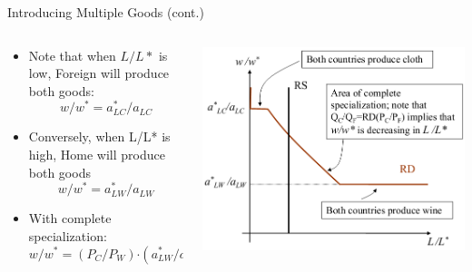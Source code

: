 \documentclass[10pt,hyperref={CJKbookmarks=true},xcolor=dvipsnames,aspectratio=169]{beamer}
\begin{document}
\begin{frame}{Introducing Multiple Goods (cont.) }


\begin{columns}[onlytextwidth]
\begin{column}{0.5\textwidth}
\begin{itemize}
\item Note that when $L/L*$ is low, Foreign will produce both goods: 
\[
w/w^{*}=a{}_{LC}^{*}/a_{LC}
\]

\item Conversely, when L/L{*} is high, Home will produce both goods 
\[
w/w^{*}=a{}_{LW}^{*}/a_{LW}
\]

\item With complete specialization: 
\[
w/w^{*}=(P_{C}/P_{W})\text{·}(a_{LW}^{*}/a_{LC})
\]

\end{itemize}

\end{column}
\begin{column}{0.5\textwidth}
\includegraphics[width=\columnwidth]{fig/ricardo/lec3-20}
\end{column}
\end{columns}


\end{frame}
\end{document}
